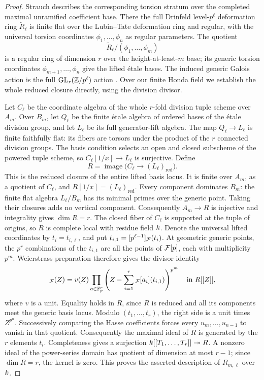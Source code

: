 \begin{proof}
Strauch describes the corresponding torsion stratum over the completed
maximal unramified coefficient base.  There the full Drinfeld
level-$p^\ell$ deformation ring $\widetilde R_\ell$ is finite flat
over the Lubin--Tate deformation ring and regular, with the universal
torsion coordinates $\phi_1,\ldots,\phi_n$ as regular parameters.
The quotient
\[
 \widetilde R_\ell/(\phi_1,\ldots,\phi_m)
\]
is a regular ring of dimension $r$ over the height-at-least-$m$
base; its generic torsion coordinates $\phi_{m+1},\ldots,\phi_n$
give the lifted \'{e}tale bases.  The induced generic Galois action
is the full $\operatorname{GL}_r(\mathbb Z/p^\ell)$ action
\citep[\S3, Proposition~4.1, and the proof of Theorem~2.1]{strauch2007}.
Over our finite Honda field we establish the whole reduced closure
directly, using the division divisor.

Let $C_\ell$ be the coordinate algebra of the whole $r$-fold division
tuple scheme over $A_m$.  Over $B_m$, let $Q_\ell$ be the finite
\'{e}tale algebra of ordered bases of the \'{e}tale division group,
and let $L_\ell$ be its full generator-lift algebra.  The map
$Q_\ell\to L_\ell$ is finite faithfully flat: its fibers are torsors
under the product of the $r$ connected division groups.  The basis
condition selects an open and closed subscheme of the powered tuple
scheme, so $C_\ell[1/x]\to L_\ell$ is surjective.  Define
\[
 R=\operatorname{image}\bigl(C_\ell\longrightarrow (L_\ell)_{\mathrm{red}}\bigr).
\]
This is the reduced closure of the entire lifted basis locus.  It is
finite over $A_m$, as a quotient of $C_\ell$, and
$R[1/x]=(L_\ell)_{\mathrm{red}}$.  Every component dominates $B_m$:
the finite flat algebra $L_\ell/B_m$ has its minimal primes over the
generic point.  Taking their closures adds no vertical component.
Consequently $A_m\to R$ is injective and integrality gives $\dim R=r$.
The closed fiber of $C_\ell$ is supported at the tuple of origins, so
$R$ is complete local with residue field $k$.
Denote the universal lifted
coordinates by $t_i=t_{i,\ell}$, and put
$t_{i,1}=[p^{\ell-1}]_{\mathcal F}(t_i)$.  At geometric generic points, the
$p^r$ combinations of the $t_{i,1}$ are all the points of
$\mathcal F[p]$, each with multiplicity $p^m$.  Weierstrass preparation
therefore gives the divisor identity
\begin{equation}
 [p]_{\cF}(Z)
  =v(Z)\prod_{a\in\Fp^r}
       \left(Z-\sum_{i=1}^{r}{}_{\cF}[a_i](t_{i,1})\right)^{p^m}
       \quad\text{in }R[[Z]],
 \label{eq:mark-basis-divisor}
\end{equation}
where $v$ is a unit.  Equality holds in $R$, since $R$ is reduced and
all its components meet the generic basis locus.  Modulo $(t_1,\ldots,t_r)$,
the right side is a unit times $Z^{p^n}$.  Successively comparing the
Hasse coefficients forces every $u_m,\ldots,u_{n-1}$ to vanish in
that quotient.  Consequently the maximal ideal of $R$ is generated
by the $r$ elements $t_i$.  Completeness gives a surjection
$k[[T_1,\ldots,T_r]]\twoheadrightarrow R$.  A nonzero ideal of
the power-series domain has quotient of dimension at most $r-1$;
since $\dim R=r$, the kernel is zero.  This proves the asserted
description of $R_{m,\ell}$ over $k$.


\end{proof}
